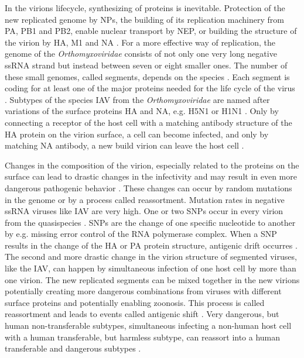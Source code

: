 In the virions lifecycle, synthesizing of proteins is inevitable. Protection of the new replicated genome by \glspl{NP}, the building of its replication machinery from \gls{PA}, \gls{PB1} and \gls{PB2}, enable nuclear transport by \gls{NEP}, or building the structure of the virion by \gls{HA}, \gls{M1} and \gls{NA} \autocite{influenza_all}. %
For a more effective way of replication, the genome of the \textit{Orthomyxoviridae} consists of not only one very long negative \gls{ssRNA} strand but instead between seven or eight smaller ones. The number of these small genomes, called segments, depends on the species %
\autocite{influenza_all}. Each segment is coding for at least one of the major proteins needed for the life cycle of the virus \autocite{influenza_all}. Subtypes of the species \gls{IAV} from the \textit{Orthomyxoviridae} are named after variations of the surface proteins \gls{HA} and \gls{NA}, e.g. H5N1 or H1N1 \autocite{naming}. Only by connecting a receptor of the host cell with a matching antibody structure of the \gls{HA} protein on the virion surface, a cell can become infected, and only by matching \gls{NA} antibody, a new build virion can leave the host cell \autocite{influenza_all}.

Changes in the composition of the virion, especially related to the proteins on the surface can lead to drastic changes in the infectivity and %
may result %
in even more dangerous pathogenic behavior \autocite{influenza_all}. These changes can occur by random mutations in the genome or by a process called reassortment. Mutation rates in negative \gls{ssRNA} viruses like \gls{IAV} are very high. One or two \glspl{SNP} occur in every virion from the quasispecies \autocite{mutation}. \glspl{SNP} are the change of one specific nucleotide to another by e.g. missing error control of the RNA polymerase complex. When a \gls{SNP} results in the change of the \gls{HA} or \gls{PA} protein structure, antigenic drift occurres %
\autocite{drift}. The second and more drastic change in the virion structure of segmented viruses, like the \gls{IAV}, can happen by simultaneous infection of one host cell by more than one virion. The new replicated segments can be mixed together in the new virions potentially creating more dangerous combinations from viruses with different surface proteins and potentially enabling zoonosis. This process is called reassortment and leads to events called antigenic shift \autocite{shift}. Very dangerous, but human non-transferable subtypes, simultaneous infecting a non-human host cell with a human transferable, but harmless subtype, can reassort into a human transferable and dangerous subtypes \autocite{shift}.

